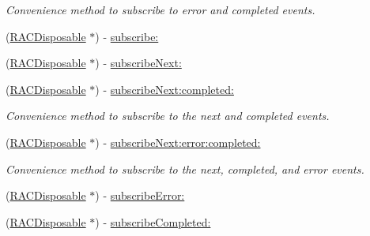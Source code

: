 \begin{DoxyCompactItemize}
\begin{DoxyCompactList}\small\item\em Convenience method to subscribe to {\ttfamily error} and {\ttfamily completed} events. \end{DoxyCompactList}\item 
(\mbox{\hyperlink{interface_r_a_c_disposable}{R\+A\+C\+Disposable}} $\ast$) -\/ \mbox{\hyperlink{category_r_a_c_signal_07_subscription_08_aeab76d632d98bbc321ec5e19575377eb}{subscribe\+:}}
\item 
(\mbox{\hyperlink{interface_r_a_c_disposable}{R\+A\+C\+Disposable}} $\ast$) -\/ \mbox{\hyperlink{category_r_a_c_signal_07_subscription_08_a50d000f05e61411c438e616475deb7f8}{subscribe\+Next\+:}}
\item 
\mbox{\label{category_r_a_c_signal_07_subscription_08_afa988fdb4bcfe4d9b7b944879d163a52}} 
(\mbox{\hyperlink{interface_r_a_c_disposable}{R\+A\+C\+Disposable}} $\ast$) -\/ \mbox{\hyperlink{category_r_a_c_signal_07_subscription_08_afa988fdb4bcfe4d9b7b944879d163a52}{subscribe\+Next\+:completed\+:}}
\begin{DoxyCompactList}\small\item\em Convenience method to subscribe to the {\ttfamily next} and {\ttfamily completed} events. \end{DoxyCompactList}\item 
\mbox{\label{category_r_a_c_signal_07_subscription_08_a50b7b51715316c5da372cc0cf96039f6}} 
(\mbox{\hyperlink{interface_r_a_c_disposable}{R\+A\+C\+Disposable}} $\ast$) -\/ \mbox{\hyperlink{category_r_a_c_signal_07_subscription_08_a50b7b51715316c5da372cc0cf96039f6}{subscribe\+Next\+:error\+:completed\+:}}
\begin{DoxyCompactList}\small\item\em Convenience method to subscribe to the {\ttfamily next}, {\ttfamily completed}, and {\ttfamily error} events. \end{DoxyCompactList}\item 
(\mbox{\hyperlink{interface_r_a_c_disposable}{R\+A\+C\+Disposable}} $\ast$) -\/ \mbox{\hyperlink{category_r_a_c_signal_07_subscription_08_a6e792da9c8499ad5791e14bd126e99cb}{subscribe\+Error\+:}}
\item 
(\mbox{\hyperlink{interface_r_a_c_disposable}{R\+A\+C\+Disposable}} $\ast$) -\/ \mbox{\hyperlink{category_r_a_c_signal_07_subscription_08_a3927c94bfca5db9dad133dd7c45563f3}{subscribe\+Completed\+:}}

\end{DoxyCompactItemize}
